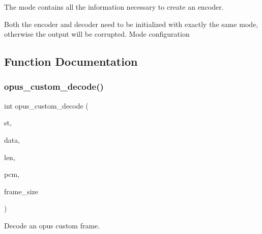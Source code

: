 The mode contains all the information necessary to create an encoder. 

Both the encoder and decoder need to be initialized with exactly the same mode, otherwise the output will be corrupted. Mode configuration 

\subsection{Function Documentation}
\mbox{\label{group__opus__custom_gafb6d3b90eed41b938009f4a32d633363}} 
\subsubsection{\texorpdfstring{opus\+\_\+custom\+\_\+decode()}{opus\_custom\_decode()}}
{\footnotesize\ttfamily int opus\+\_\+custom\+\_\+decode (\begin{DoxyParamCaption}\item[{\hyperlink{group__opus__custom_gacae60f89c5ce7aeea69503451b9e2e6f}{Opus\+Custom\+Decoder} $\ast$}]{st,  }\item[{const unsigned char $\ast$}]{data,  }\item[{int}]{len,  }\item[{\hyperlink{opus__types_8h_acc9ed7cf60479eb81f9648c6ec27dc26}{opus\+\_\+int16} $\ast$}]{pcm,  }\item[{int}]{frame\+\_\+size }\end{DoxyParamCaption})}



Decode an opus custom frame. 


